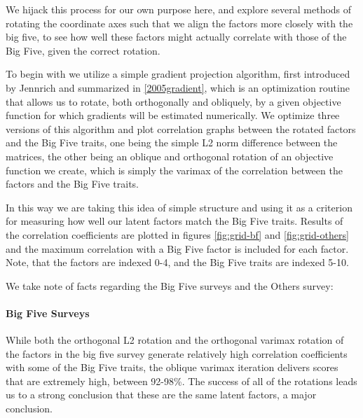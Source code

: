 \documentclass[a4paper,12pt]{article}
\begin{document}
We hijack this process for our own purpose here, and explore several methods of rotating the coordinate axes such that we align the factors more closely with the big five, to see how well these factors might actually correlate with those of the Big Five, given the correct rotation.

To begin with we utilize a simple gradient projection algorithm, first introduced by Jennrich and summarized in \ref{2005gradient}, which is an optimization routine that allows us to rotate, both orthogonally and obliquely, by a given objective function for which gradients will be estimated numerically. We optimize three versions of this algorithm and plot correlation graphs between the rotated factors and the Big Five traits, one being the simple L2 norm difference between the matrices, the other being an oblique and orthogonal rotation of an objective function we create, which is simply the varimax of the correlation between the factors and the Big Five traits.

In this way we are taking this idea of simple structure and using it as a criterion for measuring how well our latent factors match the Big Five traits. Results of the correlation coefficients are plotted in figures \ref{fig:grid-bf} and \ref{fig:grid-others} and the maximum correlation with a Big Five factor is included for each factor. Note, that the factors are indexed 0-4, and the Big Five traits are indexed 5-10.

We take note of facts regarding the Big Five surveys and the Others survey:

\paragraph{Big Five Surveys}
While both the orthogonal L2 rotation and the orthogonal varimax rotation of the factors in the big five survey generate relatively high correlation coefficients with some of the Big Five traits, the oblique varimax iteration delivers scores that are extremely high, between 92-98\%. The success of all of the rotations leads us to a strong conclusion that these are the same latent factors, a major conclusion.
\end{document}
